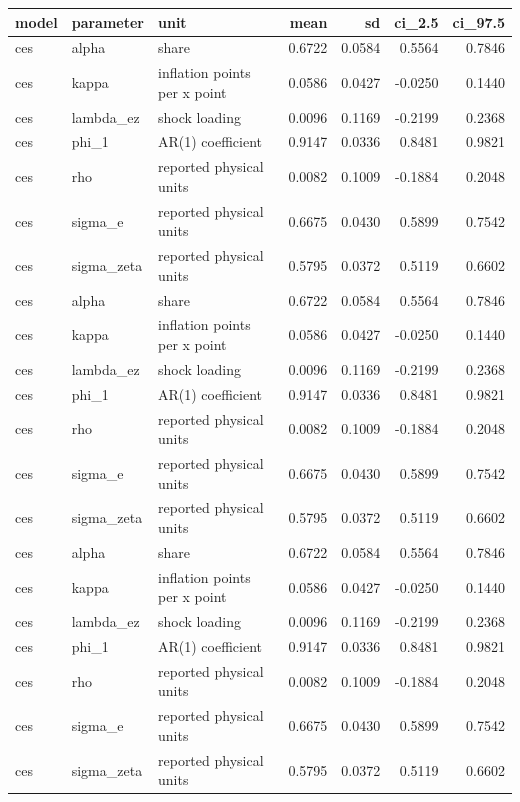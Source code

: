 \begin{tabular}{lllrrrr}
\toprule
model & parameter & unit & mean & sd & ci\_2.5 & ci\_97.5 \\
\midrule
ces & alpha & share & 0.6722 & 0.0584 & 0.5564 & 0.7846 \\
ces & kappa & inflation points per x point & 0.0586 & 0.0427 & -0.0250 & 0.1440 \\
ces & lambda\_ez & shock loading & 0.0096 & 0.1169 & -0.2199 & 0.2368 \\
ces & phi\_1 & AR(1) coefficient & 0.9147 & 0.0336 & 0.8481 & 0.9821 \\
ces & rho & reported physical units & 0.0082 & 0.1009 & -0.1884 & 0.2048 \\
ces & sigma\_e & reported physical units & 0.6675 & 0.0430 & 0.5899 & 0.7542 \\
ces & sigma\_zeta & reported physical units & 0.5795 & 0.0372 & 0.5119 & 0.6602 \\
ces & alpha & share & 0.6722 & 0.0584 & 0.5564 & 0.7846 \\
ces & kappa & inflation points per x point & 0.0586 & 0.0427 & -0.0250 & 0.1440 \\
ces & lambda\_ez & shock loading & 0.0096 & 0.1169 & -0.2199 & 0.2368 \\
ces & phi\_1 & AR(1) coefficient & 0.9147 & 0.0336 & 0.8481 & 0.9821 \\
ces & rho & reported physical units & 0.0082 & 0.1009 & -0.1884 & 0.2048 \\
ces & sigma\_e & reported physical units & 0.6675 & 0.0430 & 0.5899 & 0.7542 \\
ces & sigma\_zeta & reported physical units & 0.5795 & 0.0372 & 0.5119 & 0.6602 \\
ces & alpha & share & 0.6722 & 0.0584 & 0.5564 & 0.7846 \\
ces & kappa & inflation points per x point & 0.0586 & 0.0427 & -0.0250 & 0.1440 \\
ces & lambda\_ez & shock loading & 0.0096 & 0.1169 & -0.2199 & 0.2368 \\
ces & phi\_1 & AR(1) coefficient & 0.9147 & 0.0336 & 0.8481 & 0.9821 \\
ces & rho & reported physical units & 0.0082 & 0.1009 & -0.1884 & 0.2048 \\
ces & sigma\_e & reported physical units & 0.6675 & 0.0430 & 0.5899 & 0.7542 \\
ces & sigma\_zeta & reported physical units & 0.5795 & 0.0372 & 0.5119 & 0.6602 \\

\end{tabular}

